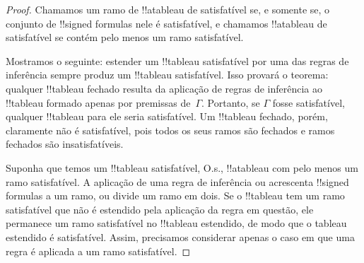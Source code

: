 \documentclass[../../../include/open-logic-section]{subfiles}
\begin{document}
\begin{proof}
Chamamos um ramo de !!a{tableau} de satisfatível se, e somente se, o conjunto de
!!{signed formula}s nele é satisfatível, e chamamos !!a{tableau} de
satisfatível se contém pelo menos um ramo satisfatível.

Mostramos o seguinte: estender um !!{tableau} satisfatível por uma das
regras de inferência sempre produz um !!{tableau} satisfatível.
Isso provará o teorema: qualquer !!{tableau} fechado resulta da
aplicação de regras de inferência ao !!{tableau} formado apenas por
premissas de~$\Gamma$. Portanto, se $\Gamma$ fosse satisfatível, qualquer
!!{tableau} para ele seria satisfatível. Um !!{tableau} fechado,
porém, claramente não é satisfatível, pois todos os seus ramos são fechados
e ramos fechados são insatisfatíveis.

Suponha que temos um !!{tableau} satisfatível, O.s.\@, !!a{tableau} com pelo
menos um ramo satisfatível. A aplicação de uma regra de inferência ou acrescenta
!!{signed formula}s a um ramo, ou divide um ramo em dois. Se o
!!{tableau} tem um ramo satisfatível que não é estendido pela aplicação
da regra em questão, ele permanece um ramo satisfatível no
!!{tableau} estendido, de modo que o tableau estendido é satisfatível. Assim,
precisamos considerar apenas o caso em que uma regra é aplicada a um
ramo satisfatível.


\end{proof}
\end{document}
